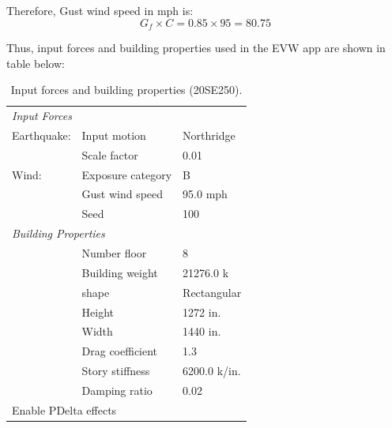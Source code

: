\documentclass[onecolumn, fleqn]{article}
\begin{document}
Therefore, Gust wind speed in mph is:
\begin{equation*}
G_f \times C = 0.85 \times 95 = \boxed{80.75}
\end{equation*}

Thus, input forces and building properties used in the EVW app are shown in table below:

\begin{table}[H]
	\centering \caption{Input forces and building properties (20SE250).}
	\begin{tabular}{lll}
	\toprule
	\multicolumn{3}{l}{\textit{Input Forces}}					\\
	\cmidrule(rl){1-3}
	Earthquake:		& Input motion		& Northridge			\\
					& Scale factor		& 0.01					\\
	Wind:			& Exposure category	& B						\\
					& Gust wind speed	& 95.0 mph				\\
					& Seed				& 100					\\
	\midrule
	\multicolumn{3}{l}{\textit{Building Properties}}			\\
	\cmidrule(rl){1-3}
					& Number floor		& 8						\\
					& Building weight	& 21276.0 k				\\
					& shape				& Rectangular			\\
					& Height			& 1272 in.				\\
					& Width				& 1440 in.				\\
					& Drag coefficient	& 1.3					\\
					& Story stiffness	& 6200.0 k/in.			\\
					& Damping ratio		& 0.02					\\
	\midrule
	\multicolumn{3}{l}{Enable PDelta effects}					\\
	\bottomrule
	\end{tabular}
\end{table}
\end{document}
